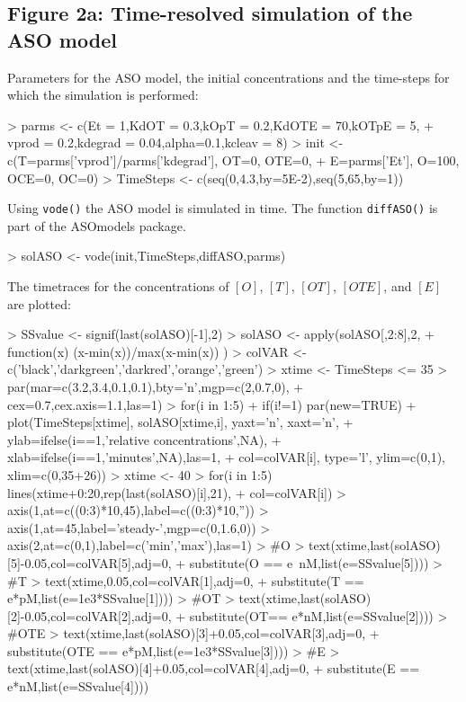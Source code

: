 \documentclass{article}
\begin{document}
\subsection*{Figure 2a: Time-resolved simulation of the ASO model}
Parameters for the ASO model, the initial concentrations and the time-steps for which the simulation is performed:
\begin{Schunk}
\begin{Sinput}
> parms <- c(Et = 1,KdOT = 0.3,kOpT = 0.2,KdOTE = 70,kOTpE = 5,  
+            vprod = 0.2,kdegrad = 0.04,alpha=0.1,kcleav = 8)
> init <- c(T=parms['vprod']/parms['kdegrad'], OT=0, OTE=0, 
+           E=parms['Et'], O=100, OCE=0, OC=0)
> TimeSteps <- c(seq(0,4.3,by=5E-2),seq(5,65,by=1))
\end{Sinput}
\end{Schunk}
Using \texttt{vode()} the ASO model is simulated in time. The function \texttt{diffASO()} is part of the ASOmodels package. 
\begin{Schunk}
\begin{Sinput}
> solASO <- vode(init,TimeSteps,diffASO,parms)
\end{Sinput}
\end{Schunk}
The timetraces for the concentrations of $[O]$, $[T]$, $[OT]$, $[OTE]$, and $[E]$ are plotted:
\begin{Schunk}
\begin{Sinput}
> SSvalue <- signif(last(solASO)[-1],2)
> solASO <- apply(solASO[,2:8],2,
+                 function(x) (x-min(x))/max(x-min(x)) )
> colVAR <- c('black','darkgreen','darkred','orange','green')
> xtime <- TimeSteps <= 35
> par(mar=c(3.2,3.4,0.1,0.1),bty='n',mgp=c(2,0.7,0),
+     cex=0.7,cex.axis=1.1,las=1)
> for(i in 1:5){ 
+   if(i!=1) par(new=TRUE)
+   plot(TimeSteps[xtime], solASO[xtime,i], yaxt='n', xaxt='n',
+        ylab=ifelse(i==1,'relative concentrations',NA), 
+        xlab=ifelse(i==1,'minutes',NA),las=1, 
+        col=colVAR[i], type='l', ylim=c(0,1), xlim=c(0,35+26)) }
> xtime <- 40
> for(i in 1:5) lines(xtime+0:20,rep(last(solASO)[i],21),
+                     col=colVAR[i])
> axis(1,at=c((0:3)*10,45),label=c((0:3)*10,''))
> axis(1,at=45,label='steady-\nstate',mgp=c(0,1.6,0))
> axis(2,at=c(0,1),label=c('min','max'),las=1)
> #O
> text(xtime,last(solASO)[5]-0.05,col=colVAR[5],adj=0,
+      substitute(O == e~nM,list(e=SSvalue[5])))
> #T
> text(xtime,0.05,col=colVAR[1],adj=0,
+      substitute(T == e*pM,list(e=1e3*SSvalue[1])))
> #OT
> text(xtime,last(solASO)[2]-0.05,col=colVAR[2],adj=0,
+      substitute(OT== e*nM,list(e=SSvalue[2])))
> #OTE
> text(xtime,last(solASO)[3]+0.05,col=colVAR[3],adj=0,
+      substitute(OTE == e*pM,list(e=1e3*SSvalue[3])))
> #E
> text(xtime,last(solASO)[4]+0.05,col=colVAR[4],adj=0,
+      substitute(E == e*nM,list(e=SSvalue[4])))
\end{Sinput}
\end{Schunk}
\end{document}
